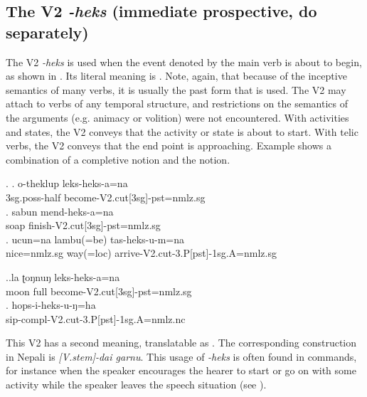 
\subsection{The V2 \emph{-heks}  (immediate prospective,  do separately)}\label{V2-cut}%

The V2  \emph{-heks}  is used when the event denoted by the main verb is about to begin, as shown in  \Next. Its literal meaning is .  Note, again, that because of the inceptive semantics of many verbs, it is usually the past form that is used. The V2 may attach to verbs of any temporal structure, and restrictions on the semantics of the arguments (e.g. animacy or volition) were not encountered. With activities and states, the V2 conveys that the activity or state is about to start. With telic verbs, the V2 conveys that the end point is approaching. Example \NNext[b] shows a combination of a completive notion and the  notion.

\ex. \ag.  o-theklup leks-heks-a=na\\
	{\sc 3sg.poss-}half become{\sc -V2.cut[3sg]-pst=nmlz.sg}\\
	\bg. sabun mend-heks-a=na\\
	soap finish{\sc -V2.cut[3sg]-pst=nmlz.sg}\\
	\bg. ucun=na lambu(=be) tas-heks-u-m=na\\
	nice{\sc =nmlz.sg} way(=loc)  arrive{\sc -V2.cut-3.P[pst]-1sg.A=nmlz.sg}\\

	
\ex.\ag.la ʈoŋnuŋ leks-heks-a=na\\
	moon full become{\sc -V2.cut[3sg]-pst=nmlz.sg}\\
	\bg. hops-i-heks-u-ŋ=ha\\
	sip{\sc -compl-V2.cut-3.P[pst]-1sg.A=nmlz.nc}\\
	
	 

This V2 has a second meaning, translatable as . The corresponding construction in Nepali is \emph{[{\sc V.stem}]-dai garnu}. This usage of \emph{-heks} is often found in commands, for instance when the speaker encourages the hearer to start or go on with some activity while the speaker leaves the speech situation (see \Next). 


